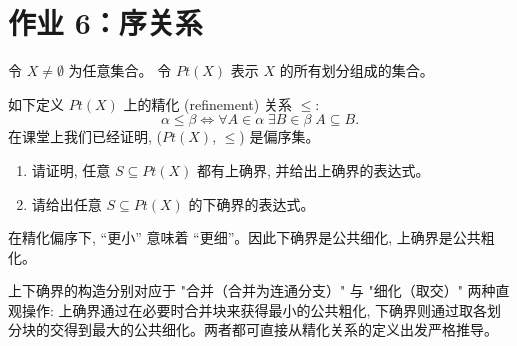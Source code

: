 
\newpage
\section{作业 6：序关系}

\begin{problem}[集合划分与精化关系]
  令 $X \neq \emptyset$ 为任意集合。
  令 $Pt(X)$ 表示 $X$ 的所有划分组成的集合。

  \noindent 如下定义 $Pt(X)$ 上的精化 (refinement) 关系 $\le$:
  \[
    \alpha \le \beta \iff
      \forall A \in \alpha\; \exists B \in \beta\; A \subseteq B.
  \]
  在课堂上我们已经证明, ($Pt(X)$, $\le$) 是偏序集。


  \begin{enumerate}[(1)]
    \item 请证明, 任意 $S \subseteq Pt(X)$ 都有上确界, 并给出上确界的表达式。
    \item 请给出任意 $S \subseteq Pt(X)$ 的下确界的表达式。
  \end{enumerate}
\end{problem}

\begin{remark}
	在精化偏序下, ``更小'' 意味着 ``更细''。因此下确界是公共细化, 上确界是公共粗化。\par
	上下确界的构造分别对应于 "合并（合并为连通分支）" 与 "细化（取交）" 两种直观操作: 上确界通过在必要时合并块来获得最小的公共粗化,
	下确界则通过取各划分块的交得到最大的公共细化。两者都可直接从精化关系的定义出发严格推导。
\end{remark}

